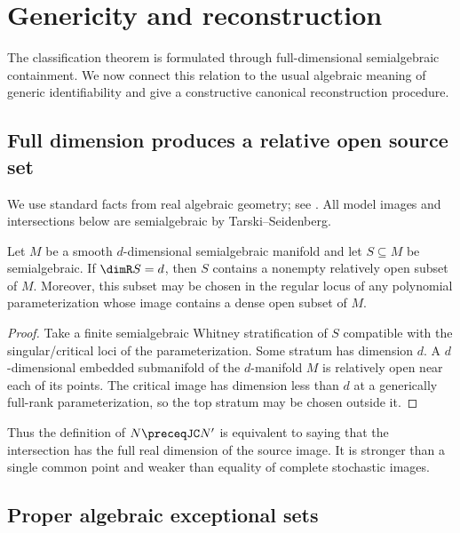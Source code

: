 \section{Genericity and reconstruction}\label{sec:genericity}

The classification theorem is formulated through full-dimensional semialgebraic containment.  We now connect this relation to the usual algebraic meaning of generic identifiability and give a constructive canonical reconstruction procedure.

\subsection{Full dimension produces a relative open source set}

We use standard facts from real algebraic geometry; see \cite{BochnakCosteRoy1998,BasuPollackRoy2006}.  All model images and intersections below are semialgebraic by Tarski--Seidenberg.

\begin{lemma}\label{lem:semialgebraic-open}
Let $M$ be a smooth $d$-dimensional semialgebraic manifold and let $S\subseteq M$ be semialgebraic.  If $\dimR S=d$, then $S$ contains a nonempty relatively open subset of $M$.  Moreover, this subset may be chosen in the regular locus of any polynomial parameterization whose image contains a dense open subset of $M$.
\end{lemma}

\begin{proof}
Take a finite semialgebraic Whitney stratification of $S$ compatible with the singular/critical loci of the parameterization.  Some stratum has dimension $d$.  A $d$-dimensional embedded submanifold of the $d$-manifold $M$ is relatively open near each of its points.  The critical image has dimension less than $d$ at a generically full-rank parameterization, so the top stratum may be chosen outside it.
\end{proof}

Thus the definition of $N\preceqJC N'$ is equivalent to saying that the intersection has the full real dimension of the source image.  It is stronger than a single common point and weaker than equality of complete stochastic images.

\subsection{Proper algebraic exceptional sets}

